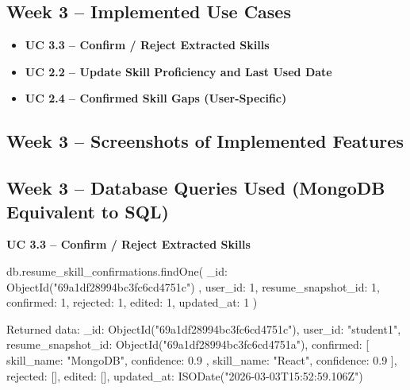 \documentclass[11pt]{article}
\begin{document}
\subsection*{Week 3 -- Implemented Use Cases}
\begin{itemize}
  \item \textbf{UC 3.3 – Confirm / Reject Extracted Skills}
  \item \textbf{UC 2.2 – Update Skill Proficiency and Last Used Date}
  \item \textbf{UC 2.4 – Confirmed Skill Gaps (User-Specific)}
\end{itemize}

\subsection*{Week 3 -- Screenshots of Implemented Features}


\subsection*{Week 3 -- Database Queries Used (MongoDB Equivalent to SQL)}

\noindent
\textbf{UC 3.3 -- Confirm / Reject Extracted Skills}
\begin{TerminalBlock}
db.resume_skill_confirmations.findOne(
  { _id: ObjectId("69a1df28994bc3fc6cd4751c") },
  {
    user_id: 1,
    resume_snapshot_id: 1,
    confirmed: 1,
    rejected: 1,
    edited: 1,
    updated_at: 1
  }
)
\end{TerminalBlock}
\begin{TerminalBlock}
Returned data:
{
  _id: ObjectId("69a1df28994bc3fc6cd4751c"),
  user_id: "student1",
  resume_snapshot_id: ObjectId("69a1df28994bc3fc6cd4751a"),
  confirmed: [
    { skill_name: "MongoDB", confidence: 0.9 },
    { skill_name: "React", confidence: 0.9 }
  ],
  rejected: [],
  edited: [],
  updated_at: ISODate("2026-03-03T15:52:59.106Z")
}
\end{TerminalBlock}
\end{document}
